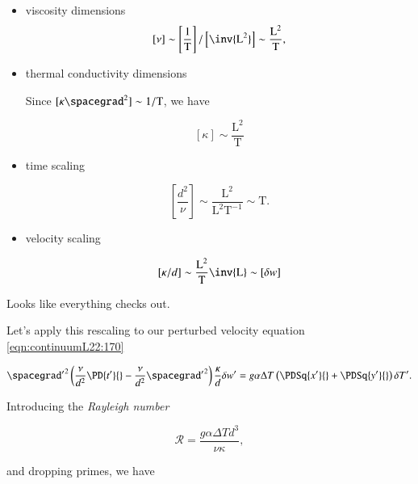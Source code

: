 \begin{itemize}
\item viscosity dimensions
\begin{equation}\label{eqn:continuumL22:270}
[\nu] \sim \left[ \frac{1}{\text{T}} \right]/ \left[\inv{\text{L}^2} \right] \sim \frac{\text{L}^2}{\text{T}},
\end{equation}
\item thermal conductivity dimensions

Since $[ \kappa \spacegrad^2 ] \sim 1/\text{T}$, we have

\begin{equation}\label{eqn:continuumL22:610}
[ \kappa ] \sim \frac{\text{L}^2}{\text{T}}
\end{equation}

\item time scaling

\begin{equation}\label{eqn:continuumL22:290}
\left[\frac{d^2}{\nu}\right] \sim \frac{\text{L}^2}{\text{L}^2 \text{T}^{-1}} \sim \text{T}.
\end{equation}

\item velocity scaling

\begin{equation}\label{eqn:continuumL22:630}
[\kappa/d] \sim \frac{\text{L}^2}{\text{T}} \inv{\text{L}} \sim [\delta w]
\end{equation}

\end{itemize}

Looks like everything checks out.

Let's apply this rescaling to our perturbed velocity equation \ref{eqn:continuumL22:170}

\begin{equation}\label{eqn:continuumL22:310}
{\spacegrad'}^2 \left( 
\frac{\nu}{d^2} \PD{t'}{} - \frac{\nu}{d^2} {\spacegrad'}^2 
\right)
\frac{\kappa}{d}
\delta w'
=
g \alpha \Delta T
\left( 
\PDSq{x'}{}
+\PDSq{y'}{}
\right) \delta T'.
\end{equation}

Introducing the \textit{Rayleigh number}

\begin{equation}\label{eqn:continuumL22:330}
\mathcal{R} = \frac{g \alpha \Delta T d^3}{\nu \kappa},
\end{equation}

and dropping primes, we have

